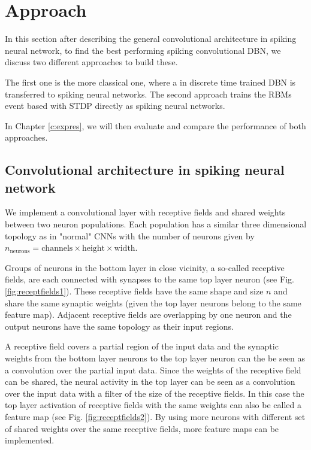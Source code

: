 \chapter{Approach} \label{c:approach}

In this section after describing the general convolutional architecture in spiking neural network, to find the best performing spiking convolutional DBN, we discuss two different approaches to build these.

The first one is the more classical one, where a in discrete time trained DBN is transferred to spiking neural networks.
The second approach trains the RBMs event based with STDP directly as spiking neural networks. 

In Chapter \ref{c:expres}, we will then evaluate and compare the performance of both approaches.

\section{Convolutional architecture in spiking neural network} \label{c:spikingconvarch}

We implement a convolutional layer with receptive fields and shared weights between two neuron populations. 
Each population has a similar three dimensional topology as in "normal" CNNs with the number of neurons given by $n_{ \text{neurons}} = \text{channels} \times \text{height} \times \text{width}$.

Groups of neurons in the bottom layer in close vicinity, a so-called receptive fields, are each connected with synapses to the same top layer neuron (see Fig. \ref{fig:receptfields1}).
These receptive fields have the same shape and size $n$ and share the same synaptic weights (given the top layer neurons belong to the same feature map).
Adjacent receptive fields are overlapping by one neuron and the output neurons have the same topology as their input regions. 

A receptive field covers a partial region of the input data and the synaptic weights from the bottom layer neurons to the top layer neuron can the be seen as a convolution over the partial input data.
Since the weights of the receptive field can be shared, the neural activity in the top layer can be seen as a convolution over the input data with a filter of the size of the receptive fields.
In this case the top layer activation of receptive fields with the same weights can also be called a feature map  (see Fig. \ref{fig:receptfields2}).
By using more neurons with different set of shared weights over the same receptive fields, more feature maps can be implemented.     

